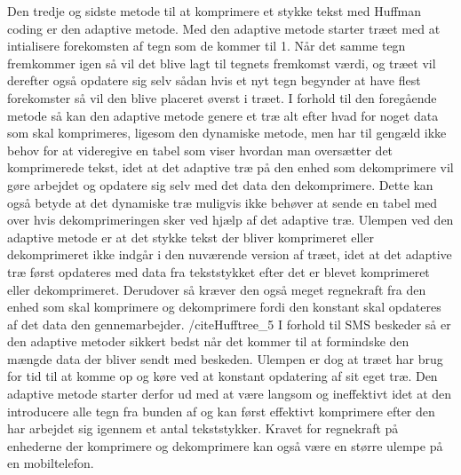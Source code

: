 Den tredje og sidste metode til at komprimere et stykke tekst med Huffman coding er den adaptive metode. Med den adaptive metode starter træet med at intialisere forekomsten af tegn som de kommer til 1. Når det samme tegn fremkommer igen så vil det blive lagt til tegnets fremkomst værdi, og træet vil derefter også opdatere sig selv sådan hvis et nyt tegn begynder at have flest forekomster så vil den blive placeret øverst i træet.
I forhold til den foregående metode så kan den adaptive metode genere et træ alt efter hvad for noget data som skal komprimeres, ligesom den dynamiske metode, men har til gengæld ikke behov for at videregive en tabel som viser hvordan man oversætter det komprimerede tekst, idet at det adaptive træ på den enhed som dekomprimere vil gøre arbejdet og opdatere sig selv med det data den dekomprimere. Dette kan også betyde at det dynamiske træ muligvis ikke behøver at sende en tabel med over hvis dekomprimeringen sker ved hjælp af det adaptive træ. Ulempen ved den adaptive metode er at det stykke tekst der bliver komprimeret eller dekomprimeret ikke indgår i den nuværende version af træet, idet at det adaptive træ først opdateres med data fra tekststykket efter det er blevet komprimeret eller dekomprimeret. Derudover så kræver den også meget regnekraft fra den enhed som skal komprimere og dekomprimere fordi den konstant skal opdateres af det data den gennemarbejder. /cite{Hufftree_5}
I forhold til SMS beskeder så er den adaptive metoder sikkert bedst når det kommer til at formindske den mængde data der bliver sendt med beskeden. Ulempen er dog at træet har brug for tid til at komme op og køre ved at konstant opdatering af sit eget træ. Den adaptive metode starter derfor ud med at være langsom og ineffektivt idet at den introducere alle tegn fra bunden af og kan først effektivt komprimere efter den har arbejdet sig igennem et antal tekststykker. Kravet for regnekraft på enhederne der komprimere og dekomprimere  kan også være en større ulempe på en mobiltelefon.